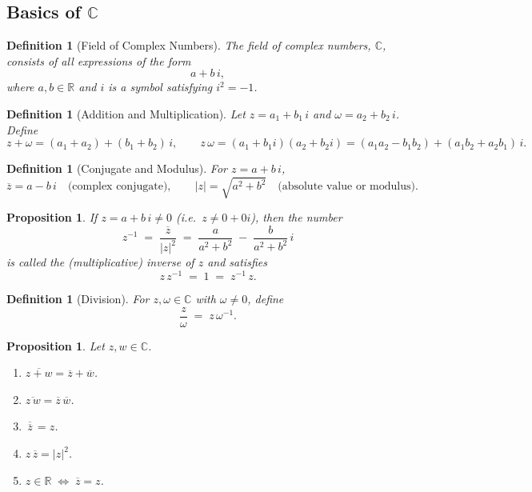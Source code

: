 \documentclass[12pt]{article}
\theoremstyle{break}             %
\newtheorem{prop}[thm]{Proposition}%
\newtheorem{defn}[thm]{Definition}
\begin{document}
\subsection{Basics of \(\mathbb{C}\)}

\begin{defn}[Field of Complex Numbers]
The field of complex numbers, \(\mathbb{C}\), consists of all expressions of the form
\[
a + b\,i,
\]
where \(a,b\in\mathbb{R}\) and \(i\) is a symbol satisfying \(i^2=-1\).
\end{defn}

\begin{defn}[Addition and Multiplication]
Let \(z = a_1 + b_1\,i\) and \(\omega = a_2 + b_2\,i\).  Define
\[
z + \omega = (a_1 + a_2) + (b_1 + b_2)\,i,
\qquad
z\,\omega = (a_1 + b_1 i)(a_2 + b_2 i)
= (a_1a_2 - b_1b_2) + (a_1b_2 + a_2b_1)\,i.
\]
\end{defn}

\begin{defn}[Conjugate and Modulus]
For \(z = a + b\,i\),
\[
\overline{z} = a - b\,i
\quad\text{(complex conjugate)}, 
\qquad
|z| = \sqrt{a^2 + b^2}
\quad\text{(absolute value or modulus)}.
\]
\end{defn}

\begin{prop}
If \(z = a + b\,i \neq 0\) (i.e.\ \(z \neq 0 + 0i\)), then the number
\[
z^{-1} \;=\; \frac{\overline{z}}{\lvert z \rvert^2} 
\;=\; \frac{a}{a^2 + b^2} \;-\; \frac{b}{a^2 + b^2}\,i
\]
is called the \emph{(multiplicative) inverse} of \(z\) and satisfies 
\[
z \, z^{-1} \;=\; 1 
\;=\; z^{-1}\,z.
\]
\end{prop}

\begin{defn}[Division]
For \(z,\omega\in\mathbb{C}\) with \(\omega\neq0\), define
\[
\frac{z}{\omega} \;=\; z\,\omega^{-1}.
\]
\end{defn}

\begin{prop}
Let \(z,w \in \mathbb{C}\).  
\begin{enumerate}
\item \(\overline{z + w} = \overline{z} + \overline{w}\).
\item \(\overline{z\,w} = \overline{z}\,\overline{w}\).
\item \(\overline{\,\overline{z}\,} = z\).
\item \(z \,\overline{z} = \lvert z\rvert^{2}\).
\item \(z \in \mathbb{R} \;\Longleftrightarrow\; \overline{z} = z\).
\end{enumerate}
\end{prop}
\end{document}
